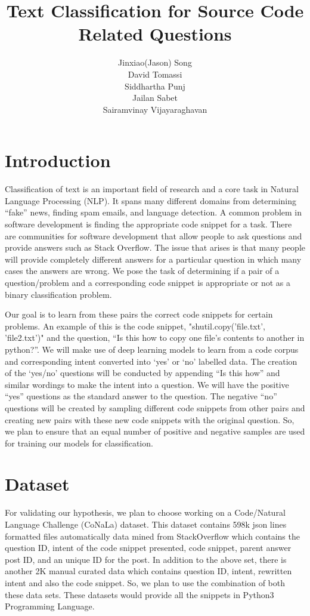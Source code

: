 \documentclass[11pt,a4paper]{article}
\title{Text Classification for Source Code Related Questions}
\author{
  Jinxiao(Jason) Song \\ \And
  David Tomassi \\ \And
  Siddhartha Punj\\ \AND
  Jailan Sabet\\ \And
  Sairamvinay Vijayaraghavan}
\date{}
\begin{document}
\maketitle

\section{Introduction}
Classification of text is an important field of research and a core
task in Natural Language Processing (NLP). It spans many different
domains from determining “fake” news, finding spam emails, and
language detection. A common problem in software development is
finding the appropriate code snippet for a task. There are communities
for software development that allow people to ask questions and
provide answers such as Stack Overflow. The issue that arises is that
many people will provide completely different answers for a particular
question in which many cases the answers are wrong. We pose the task
of determining if a pair of a question/problem and  a corresponding
code snippet is appropriate or not as a binary classification problem.

Our goal is to learn from these pairs the correct code snippets for
certain problems. An example of this is the code snippet,
"shutil.copy('file.txt', 'file2.txt')" and the question, “Is this how
to copy one file's contents to another in python?”. We will make use
of deep learning models to learn from a code corpus and corresponding
intent converted into ‘yes’ or ‘no’ labelled data. The creation of the
‘yes/no’ questions will be conducted by appending “Is this how” and
similar wordings to make the intent into a question. We will have the
positive “yes” questions as the standard answer to the question. The
negative “no” questions will be created by sampling different code
snippets from other pairs and creating new pairs with these new code
snippets with the original question. So, we plan to ensure that an
equal number of positive and negative samples are used for training
our models for classification.

\section{Dataset}
For validating our hypothesis, we plan to choose working on a
Code/Natural Language Challenge (CoNaLa) dataset. This dataset
contains 598k json lines formatted files automatically data mined from
StackOverflow which contains the question ID, intent of the code
snippet presented, code snippet, parent answer post ID, and an unique
ID for the post. In addition to the above set, there is another 2K
manual curated data which contains question ID, intent, rewritten
intent and also the code snippet. So, we plan to use the combination
of both these data sets. These datasets would provide all the snippets
in Python3 Programming Language.
\end{document}
